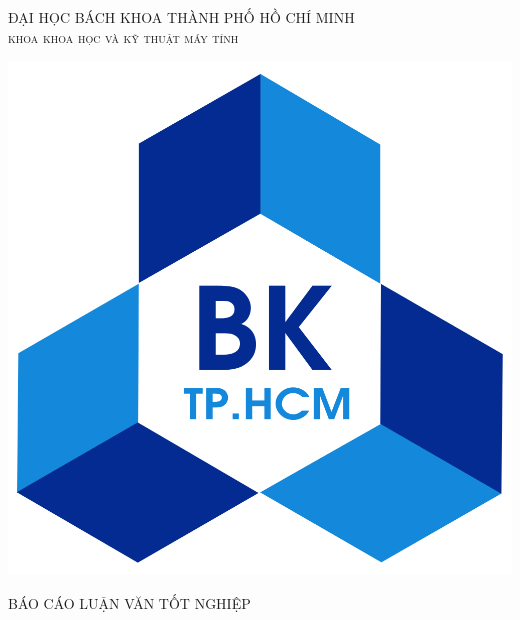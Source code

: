 

\newcommand{\HRule}{\rule{\linewidth}{0.5mm}} %
\newcommand\tab[1][1cm]{\hspace*{#1}}

\center %
 

\textsc{\large ĐẠI HỌC BÁCH KHOA THÀNH PHỐ HỒ CHÍ MINH}\\[0.2cm] %
\textsc{\Large \scshape khoa khoa học và kỹ thuật máy tính}\\[0.5cm] %
\begin{center}
    \includegraphics[scale=.14]{image/logo}
\end{center}

\textsc{\large BÁO CÁO LUẬN VĂN TỐT NGHIỆP}\\[0.2cm] %


